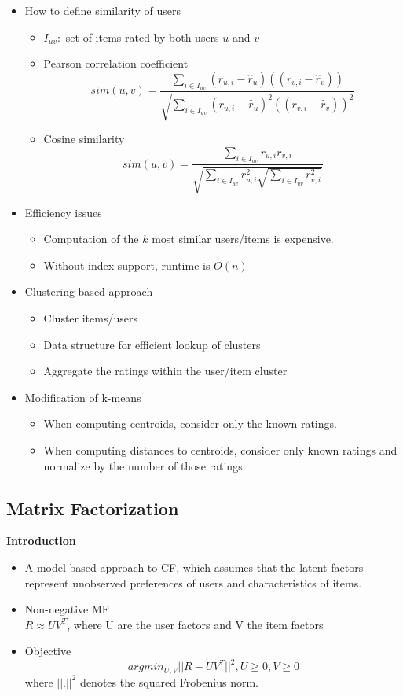 \documentclass[../notes.tex]{subfiles}
\begin{document}
\begin{itemize}
  \item How to define similarity of users
  \begin{itemize}
    \item $I_{uv}:$ set of items rated by both users $u$ and $v$
    \item Pearson correlation coefficient
    $$sim(u,v) = \frac{\sum_{i \in I_{uv}} (r_{u,i} - \hat r_u) ((r_{v,i} - \hat r_v))}{\sqrt{\sum_{i \in I_{uv}} (r_{u,i} - \hat r_u)^2 ((r_{v,i} - \hat r_v))^2}}$$
    \item Cosine similarity
    $$sim(u,v) = \frac{\sum_{i \in I_{uv}} r_{u,i} r_{v,i}}{\sqrt{\sum_{i \in I_{uv}} r_{u,i}^2 \sqrt{\sum_{i \in I_{uv}} r_{v,i}^2}}}$$
  \end{itemize}

  \item Efficiency issues
  \begin{itemize}
    \item Computation of the $k$ most similar users/items is expensive.
    \item Without index support, runtime is $O(n)$
  \end{itemize}

  \item Clustering-based approach
  \begin{itemize}
    \item Cluster items/users
    \item Data structure for efficient lookup of clusters
    \item Aggregate the ratings within the user/item cluster
  \end{itemize}

  \item Modification of k-means
  \begin{itemize}
    \item When computing centroids, consider only the known ratings.
    \item When computing distances to centroids, consider only known ratings and normalize by the number of those ratings.
  \end{itemize}
\end{itemize}

\subsection{Matrix Factorization}

\textbf{Introduction}
\begin{itemize}
  \item A model-based approach to CF, which assumes that the latent factors represent unobserved preferences of users and characteristics of items.
  \item Non-negative MF \\ $R \approx UV^T$, where U are the user factors and V the item factors
  \item Objective $$ argmin_{U,V}||R - UV^T||^2, U \ge 0, V \ge 0$$ where $||.||^2$ denotes the squared Frobenius norm.
\end{itemize}
\end{document}
